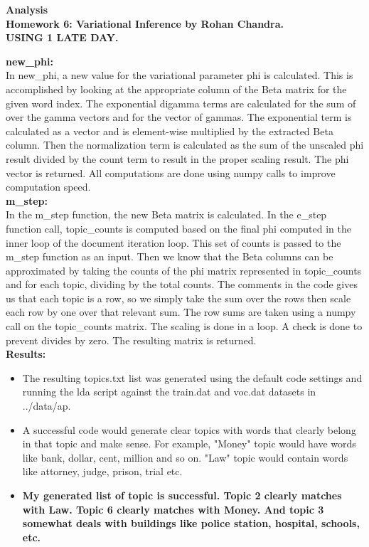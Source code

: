 \documentclass[a4paper]{article}
\begin{document}
	
\begin{tcolorbox}
\begin{center}
\textbf{\large{Analysis}\\ Homework 6: Variational Inference by Rohan Chandra.\\ USING 1 LATE DAY.}
\end{center}
\end{tcolorbox}

\textbf{new\_phi: }\\
In new\_phi, a new value for the variational parameter phi is calculated. This is accomplished by looking at the appropriate column of the Beta matrix for the given word index. The exponential digamma terms are calculated for the sum of over the gamma vectors and for the vector of gammas. The exponential term is calculated as a vector and is element-wise multiplied by the extracted Beta column. Then the normalization term is calculated as the sum of the unscaled phi result divided by the count term to result in the proper scaling result. The phi vector is returned. All computations are done using numpy calls to improve computation speed. \\

\textbf{m\_step: }\\
In the m\_step function, the new Beta matrix is calculated. In the e\_step function call, topic\_counts is computed based on the final phi computed in the inner loop of the document iteration loop. This set of counts is passed to the m\_step function as an input. Then we know that the Beta columns can be approximated by taking the counts of the phi matrix represented in topic\_counts and for each topic, dividing by the total counts. The comments in the code gives us that each topic is a row, so we simply take the sum over the rows then scale each row by one over that relevant sum. The row sums are taken using a numpy call on the topic\_counts matrix. The scaling is done in a loop. A check is done to prevent divides by zero. The resulting matrix is returned. \\

\textbf{Results: }\\
\begin{itemize}
	\item The resulting topics.txt list was generated using the default code settings and running the lda script against the train.dat and voc.dat datasets in ../data/ap.
	\item  A successful code would generate clear topics with words that clearly belong in that topic and make sense. For example, "Money" topic would have words like bank, dollar, cent, million and so on. "Law" topic would contain words like attorney, judge, prison, trial etc. 
	\item \textbf{My generated list of topic is successful. Topic 2 clearly matches with Law. Topic 6 clearly matches with Money. And topic 3 somewhat deals with buildings like police station, hospital, schools, etc.}

\end{itemize}
\end{document}
